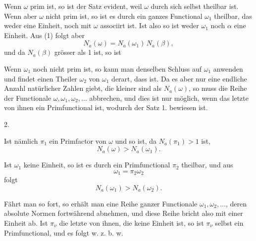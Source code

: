 Wenn $\omega$ prim ist, so ist der Satz evident, weil $\omega$ durch sich selbst theilbar ist. Wenn aber $\omega$ nicht prim ist, so ist es durch ein ganzes Functional $\omega_1$ theilbar, das weder eine Einheit, noch mit $\omega$ associirt ist. Ist also
so ist weder $\omega_1$ noch $\alpha$ eine Einheit. Aus (1) folgt aber
\[
N_a(\omega) = N_a(\omega_1)\, N_a(\beta), %
\]
und da $N_a(\beta)$ grösser als 1 ist, so ist

Wenn $\omega_1$ noch nicht prim ist, so kann man denselben Schluss auf $\omega_1$ anwenden und findet einen Theiler $\omega_2$ von $\omega_1$ derart, dass
ist. Da es aber nur eine endliche Anzahl natürlicher Zahlen giebt, die kleiner sind als $N_a(\omega)$, so muss die Reihe der Functionale $\omega, \omega_1, \omega_2, \ldots$ abbrechen, und dies ist nur möglich, wenn das letzte von ihnen ein Primfunctional ist, wodurch der Satz 1. bewiesen ist.

2. 

Ist nämlich $\pi_1$ ein Primfactor von $\omega$ und
so ist, da $N_a(\pi_1) > 1$ ist,
\[
N_a(\omega) > N_a(\omega_1).
\]

Ist $\omega_1$ keine Einheit, so ist es durch ein Primfunctional $\pi_2$ theilbar, und aus
\[
\omega_1 = \pi_2 \omega_2
\]
folgt
\[
N_a(\omega_1) > N_a(\omega_2).
\]

Fährt man so fort, so erhält man eine Reihe ganzer Functionale $\omega_1, \omega_2, \ldots$, deren absolute Normen fortwährend abnehmen, und diese Reihe bricht also mit einer Einheit ab. Ist $\pi_\nu$ die letzte von ihnen, die keine Einheit ist, so ist $\pi_\nu$ selbst ein Primfunctional, und es folgt
w. z. b. w.
